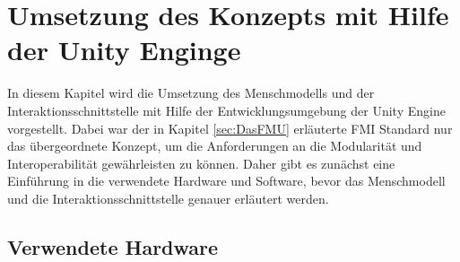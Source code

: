 \chapter{Umsetzung des Konzepts mit Hilfe der Unity Enginge}\label{cha:Umsetzung}
In diesem Kapitel wird die Umsetzung des Menschmodells und der Interaktionsschnittstelle mit Hilfe der Entwicklungsumgebung der Unity Engine vorgestellt. Dabei war der in Kapitel \ref{sec:DasFMU} erläuterte FMI Standard nur das übergeordnete Konzept, um die Anforderungen an die Modularität und Interoperabilität gewährleisten zu können. Daher gibt es zunächst eine Einführung in die verwendete Hardware und Software, bevor das Menschmodell und die Interaktionsschnittstelle genauer erläutert werden.
\section{Verwendete Hardware}\label{sec:Hardware}


